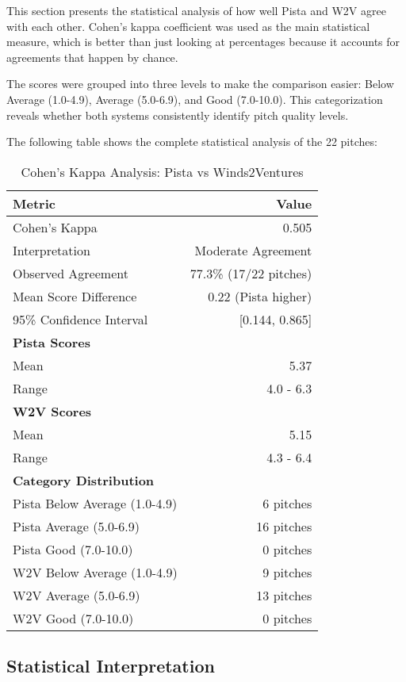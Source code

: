 This section presents the statistical analysis of how well Pista and W2V agree with each other. Cohen's kappa coefficient was used as the main statistical measure, which is better than just looking at percentages because it accounts for agreements that happen by chance.

The scores were grouped into three levels to make the comparison easier: Below Average (1.0-4.9), Average (5.0-6.9), and Good (7.0-10.0). This categorization reveals whether both systems consistently identify pitch quality levels.

The following table shows the complete statistical analysis of the 22 pitches:

\begin{table}[h]
\centering
\caption{Cohen's Kappa Analysis: Pista vs Winds2Ventures}
\label{tab:cohens-kappa}
\begin{tabular}{lr}
\hline
\textbf{Metric} & \textbf{Value} \\
\hline
Cohen's Kappa & 0.505 \\
Interpretation & Moderate Agreement \\
Observed Agreement & 77.3\% (17/22 pitches) \\
Mean Score Difference & 0.22 (Pista higher) \\
95\% Confidence Interval & [0.144, 0.865] \\
\hline
\textbf{Pista Scores} & \\
Mean & 5.37 \\
Range & 4.0 - 6.3 \\
\hline
\textbf{W2V Scores} & \\
Mean & 5.15 \\
Range & 4.3 - 6.4 \\
\hline
\textbf{Category Distribution} & \\
Pista Below Average (1.0-4.9) & 6 pitches \\
Pista Average (5.0-6.9) & 16 pitches \\
Pista Good (7.0-10.0) & 0 pitches \\
W2V Below Average (1.0-4.9) & 9 pitches \\
W2V Average (5.0-6.9) & 13 pitches \\
W2V Good (7.0-10.0) & 0 pitches \\
\hline
\end{tabular}
\end{table}

\subsection{Statistical Interpretation}

